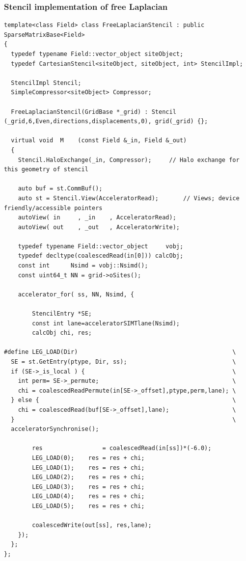 \documentclass[pdf,ps,8pt]{beamer}
\newcommand{\miniscule}{\fontsize{3pt}{4pt}\selectfont}
\begin{document}
\begin{frame}[fragile]\small\frametitle{ Stencil implementation of free Laplacian}
{\miniscule
\begin{verbatim}
template<class Field> class FreeLaplacianStencil : public SparseMatrixBase<Field>
{
  typedef typename Field::vector_object siteObject;
  typedef CartesianStencil<siteObject, siteObject, int> StencilImpl;

  StencilImpl Stencil;
  SimpleCompressor<siteObject> Compressor;

  FreeLaplacianStencil(GridBase *_grid) : Stencil    (_grid,6,Even,directions,displacements,0), grid(_grid) {};

  virtual void  M    (const Field &_in, Field &_out)
  {
    Stencil.HaloExchange(_in, Compressor);     // Halo exchange for this geometry of stencil

    auto buf = st.CommBuf();
    auto st = Stencil.View(AcceleratorRead);       // Views; device friendly/accessible pointers
    autoView( in     , _in    , AcceleratorRead);
    autoView( out    , _out   , AcceleratorWrite);

    typedef typename Field::vector_object     vobj;
    typedef decltype(coalescedRead(in[0])) calcObj;
    const int      Nsimd = vobj::Nsimd();
    const uint64_t NN = grid->oSites();

    accelerator_for( ss, NN, Nsimd, {

        StencilEntry *SE;
        const int lane=acceleratorSIMTlane(Nsimd);
        calcObj chi, res;

#define LEG_LOAD(Dir)                                            \
  SE = st.GetEntry(ptype, Dir, ss);                              \
  if (SE->_is_local ) {                                          \
    int perm= SE->_permute;                                      \
    chi = coalescedReadPermute(in[SE->_offset],ptype,perm,lane); \
  } else {                                                       \
    chi = coalescedRead(buf[SE->_offset],lane);                  \
  }                                                              \
  acceleratorSynchronise();

        res                 = coalescedRead(in[ss])*(-6.0);
        LEG_LOAD(0);	res = res + chi;
        LEG_LOAD(1);	res = res + chi;
        LEG_LOAD(2);	res = res + chi;
        LEG_LOAD(3);	res = res + chi;
        LEG_LOAD(4);	res = res + chi;
        LEG_LOAD(5);	res = res + chi;

        coalescedWrite(out[ss], res,lane);
    });
  };
};
\end{verbatim}
}
\end{frame}
\end{document}
